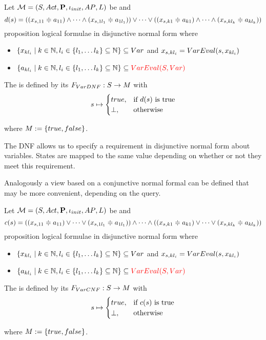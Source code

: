 \documentclass[preview]{standalone}
\begin{document}
\begin{definition}
	Let $\chgph = \chgphtuple$ be \chosengraphtypeN and 
	\[
	d(s) = ((\varstate[,11] \eqorneq \varval_{11}) \land \dots \land (\varstate[,1l_1] \eqorneq \varval_{1l_1})) \lor \dots \lor ((\varstate[,k1] \eqorneq \varval_{k1}) \land \dots \land (\varstate[,kl_k]  \eqorneq \varval_{kl_k}))
	\]
	proposition logical formulae in disjunctive normal form where
	\begin{itemize}
		\item $\{\var_{kl_i} \mid k \in \natnums, l_i \in \{l_1, \dots l_k\} \subseteq \natnums\} \subseteq \vars$ and $\varstate[,kl_i] = \vareval(\state, \var_{kl_i})$
		\item $\{\varval_{kl_i} \mid k \in \natnums, l_i \in \{l_1, \dots l_k\} \subseteq \natnums\} \subseteq \redcomment{\vareval(\states,\vars)}$
	\end{itemize}
	The \viewN \viewparamdnf is defined by its \grpfctN $\gfctparamdnf : \states \to \imggrp$ with
	\[
	\state \mapsto
	\begin{cases}
		true, &\text{if } d(s) \text{ is true}\\
		\remelem, 	&\text{otherwise}
	\end{cases}
	\]
	
	where $\imggrp := \{true, false\}$.
\end{definition}


The DNF allows us to specify a requirement in disjunctive normal form about variables. States are mapped to the same value depending on whether or not they meet this requirement.


Analogously a view based on a conjunctive normal formal can be defined that may be more convenient, depending on the query.

\begin{definition}
	Let $\chgph = \chgphtuple$ be \chosengraphtypeN and 
	\[
	c(s) = ((\varstate[,11] \eqorneq \varval_{11}) \lor \dots \lor (\varstate[,1l_1] \eqorneq \varval_{1l_1})) \land \dots \land ((\varstate[,k1] \eqorneq \varval_{k1}) \lor \dots \lor (\varstate[,kl_k]  \eqorneq \varval_{kl_k}))
	\]
	proposition logical formulae in disjunctive normal form where
	\begin{itemize}
		\item $\{\var_{kl_i} \mid k \in \natnums, l_i \in \{l_1, \dots l_k\} \subseteq \natnums\} \subseteq \vars$ and $\varstate[,kl_i] = \vareval(\state, \var_{kl_i})$
		\item $\{\varval_{kl_i} \mid k \in \natnums, l_i \in \{l_1, \dots l_k\} \subseteq \natnums\} \subseteq \redcomment{\vareval(\states,\vars)}$
	\end{itemize}
	The \viewN \viewparamcnf is defined by its \grpfctN $\gfctparamcnf : \states \to \imggrp$ with
	\[
	\state \mapsto
	\begin{cases}
		true, &\text{if } c(s) \text{ is true}\\
		\remelem, 	&\text{otherwise}
	\end{cases}
	\]
	
	where $\imggrp := \{true, false\}$.
\end{definition}
\end{document}
